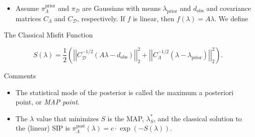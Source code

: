 \documentclass[11pt]{beamer}
\newcommand{\D}{\mathcal{D}}
\begin{document}
\begin{frame}

\begin{itemize}
	
	\item Assume $\pi_\Lambda^\text{prior}$ and $\pi_\mathcal{D}$ are Gaussians with means $\lambda_{\text{prior}}$ and $d_{\text{obs}}$ and covariance matrices $C_\Lambda$ and $C_\D$, respectively. If $f$ is linear, then $f(\lambda)=A \lambda$. We define
	
\end{itemize}

\begin{block}{The Classical Misfit Function \footnotemark[1]}


\begin{equation} \label{eq:2}
S(\lambda)=\frac{1}{2}\left(\left|\left|C_\mathcal{D}^{-1/2}(A\lambda-d_{\text{obs}})\right|\right|_2^2+\left|\left|C_\Lambda^{-1/2}(\lambda-\lambda_{\text{prior}})\right|\right|_2^2\right).
\end{equation}

\end{block} 

\begin{block}{Comments}

\begin{itemize}

\item The statistical mode of the posterior is called the maximum a posteriori point, or \textit{MAP point}.  

\item The $\lambda$ value that minimizes $S$ is the MAP, $\lambda_S^*$, and the classical solution to the (linear) SIP is $\pi_\Lambda^\text{post}(\lambda) = c\cdot \exp(-S(\lambda)).$ 


\end{itemize}

\end{block}


\end{frame}
\end{document}
